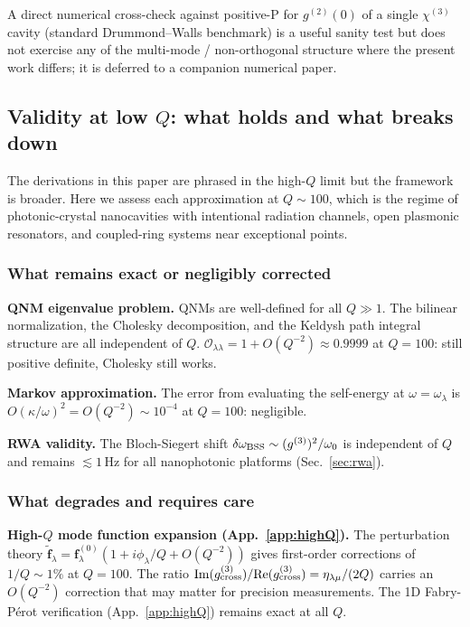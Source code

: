 \documentclass[12pt]{article}
\newcommand{\tf}{\tilde{\mathbf{f}}}
\begin{document}
A direct numerical cross-check against positive-P for $g^{(2)}(0)$ of a
single $\chi^{(3)}$ cavity (standard Drummond--Walls benchmark) is a
useful sanity test but does not exercise any of the multi-mode /
non-orthogonal structure where the present work differs; it is
deferred to a companion numerical paper.

\subsection{Validity at low $Q$: what holds and what breaks down}
\label{sec:lowQ}

The derivations in this paper are phrased in the high-$Q$ limit but the
framework is broader.  Here we assess each approximation at $Q\sim 100$,
which is the regime of photonic-crystal nanocavities with intentional
radiation channels, open plasmonic resonators, and coupled-ring systems
near exceptional points.

\subsubsection*{What remains exact or negligibly corrected}

\textbf{QNM eigenvalue problem.}  QNMs are well-defined for all $Q\gg 1$.
The bilinear normalization, the Cholesky decomposition, and the Keldysh
path integral structure are all independent of $Q$.
$\mathcal{O}_{\lambda\lambda} = 1 + O(Q^{-2}) \approx 0.9999$ at $Q=100$:
still positive definite, Cholesky still works.

\textbf{Markov approximation.}  The error from evaluating the self-energy
at $\omega=\omega_\lambda$ is $O(\kappa/\omega)^2 = O(Q^{-2}) \sim 10^{-4}$
at $Q=100$: negligible.

\textbf{RWA validity.}  The Bloch-Siegert shift
$\delta\omega_{\rm BSS}\sim(g^{(3)})^2/\omega_0$ is independent of $Q$
and remains $\lesssim 1\,\mathrm{Hz}$ for all nanophotonic platforms
(Sec.~\ref{sec:rwa}).

\subsubsection*{What degrades and requires care}

\textbf{High-$Q$ mode function expansion (App.~\ref{app:highQ}).}
The perturbation theory $\tf_\lambda = \mathbf{f}^{(0)}_\lambda
(1 + i\phi_\lambda/Q + O(Q^{-2}))$ gives first-order corrections of
$1/Q\sim 1\%$ at $Q=100$.  The ratio
$\mathrm{Im}(g^{(3)}_{\rm cross})/\mathrm{Re}(g^{(3)}_{\rm cross})
= \eta_{\lambda\mu}/(2Q)$ carries an $O(Q^{-2})$ correction that may
matter for precision measurements.  The 1D Fabry-P\'{e}rot verification
(App.~\ref{app:highQ}) remains exact at all $Q$.
\end{document}
